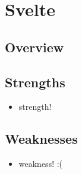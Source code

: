 
\section{Svelte}
\label{sec:svelte}

\subsection{Overview}
\label{subsec:svelte:overview}

\subsection{Strengths}
\label{subsec:svelte:strengths}
\begin{itemize}
    \item strength! 
\end{itemize}

\subsection{Weaknesses}
\label{subsec:svelte:weaknesses}
\begin{itemize}
    \item weakness! :( 
\end{itemize}